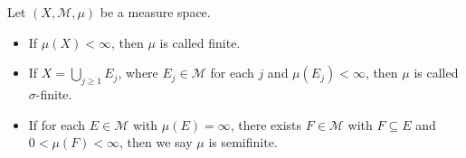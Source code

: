 \documentclass[10pt]{mypackage}
\begin{document}
\begin{definition}
  Let $\left(X,\mathcal{M},\mu\right)$ be a measure space.
  \begin{itemize}
    \item If $\mu\left(X\right) < \infty$, then $\mu$ is called finite.
    \item If $X = \bigcup_{j\geq 1}E_j$, where $E_j\in \mathcal{M}$ for each $j$ and $\mu\left(E_j\right) < \infty$, then $\mu$ is called $\sigma$-finite.
    \item If for each $E\in \mathcal{M}$ with $\mu\left(E\right) = \infty$, there exists $F\in \mathcal{M}$ with $F\subseteq E$ and $0 < \mu\left(F\right) < \infty$, then we say $\mu$ is semifinite.
  \end{itemize}
\end{definition}
\end{document}
